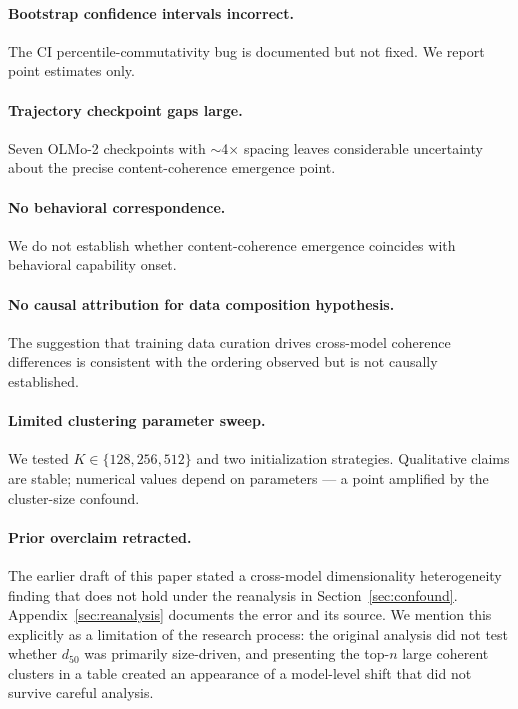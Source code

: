 \documentclass[11pt,letterpaper]{article}
\begin{document}
\paragraph{Bootstrap confidence intervals incorrect.} The CI percentile-commutativity bug is documented but not fixed. We report point estimates only.

\paragraph{Trajectory checkpoint gaps large.} Seven OLMo-2 checkpoints with $\sim$4$\times$ spacing leaves considerable uncertainty about the precise content-coherence emergence point.

\paragraph{No behavioral correspondence.} We do not establish whether content-coherence emergence coincides with behavioral capability onset.

\paragraph{No causal attribution for data composition hypothesis.} The suggestion that training data curation drives cross-model coherence differences is consistent with the ordering observed but is not causally established.

\paragraph{Limited clustering parameter sweep.} We tested $K \in \{128, 256, 512\}$ and two initialization strategies. Qualitative claims are stable; numerical values depend on parameters --- a point amplified by the cluster-size confound.

\paragraph{Prior overclaim retracted.} The earlier draft of this paper stated a cross-model dimensionality heterogeneity finding that does not hold under the reanalysis in Section~\ref{sec:confound}. Appendix~\ref{sec:reanalysis} documents the error and its source. We mention this explicitly as a limitation of the research process: the original analysis did not test whether $d_{50}$ was primarily size-driven, and presenting the top-$n$ large coherent clusters in a table created an appearance of a model-level shift that did not survive careful analysis.
\end{document}
